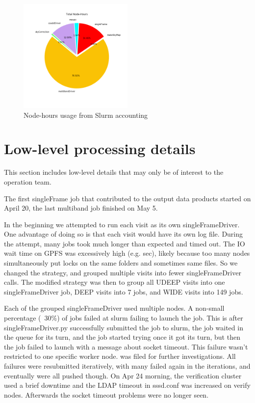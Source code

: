 \begin{figure}[h]
\includegraphics[width=0.50\textwidth]{PDR1_Total_pie.png}
\caption{Node-hours usage from Slurm accounting}
\label{figs}
\end{figure}


\section{Low-level processing details}
This section includes low-level details that may only be of interest to the operation team.

The first singleFrame job that contributed to the output data products started on April 20, the last multiband job finished on May 5.

In the beginning we attempted to run each visit as its own singleFrameDriver. One advantage of doing so is that each visit would have its own log file. During the attempt, many jobs took much longer than expected and timed out. The IO wait time on GPFS was excessively high (e.g.  sec), likely because too many nodes simultaneously put locks on the same folders and sometimes same files. So we changed the strategy, and grouped multiple visits into fewer singleFrameDriver calls. The modified strategy was then to group all UDEEP visits into one singleFrameDriver job, DEEP visits into 7 jobs, and WIDE visits into 149 jobs.

Each of the grouped singleFrameDriver used multiple nodes. A non-small percentage (~30\%) of jobs failed at slurm failing to launch the job. This is after singleFrameDriver.py successfully submitted the job to slurm, the job waited in the queue for its turn, and the job started trying once it got its turn, but then the job failed to launch with a message about socket timeout. This failure wasn't restricted to one specific worker node. 
 was filed for further investigations. All failures were resubmitted iteratively, with many failed again in the iterations, and eventually were all pushed though.  On Apr 24 morning, the verification cluster used a brief downtime and the LDAP timeout in sssd.conf was increased on verify nodes. Afterwards the socket timeout problems were no longer seen.

